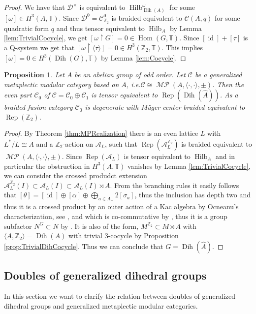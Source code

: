 \documentclass[twoside,11pt,reqno]{amsart}
\makeatletter
\newtheorem{prop}[thm]{Proposition}
\theoremstyle{definition}
\theoremstyle{remark}
\newcommand{\cD}{\mathcal{D}}
\newcommand{\cC}{\mathcal{C}}
\newcommand{\A}{\mathcal{A}}
\newcommand{\TT}{\mathbb{T}}
\newcommand{\ZZ}{\mathbb{Z}}
\DeclareMathOperator{\Rep}{Rep}
\DeclareMathOperator{\Hom}{Hom}
\DeclareMathOperator{\id}{id}
\DeclareRobustCommand{\ie}{i.e.\@\xspace}
\DeclareMathOperator{\Dih}{Dih}
\DeclareMathOperator*{\MP}{\mathcal{MP}}
\DeclareMathOperator{\Vect}{Hilb}
\newcommand{\bi}[2]{\langle #1,#2\rangle}
\newcommand{\bislotslot}{\bi\cdot\cdot}
\makeatother
\begin{document}
\begin{proof}
  We have that $\cD^\times$ is equivalent to $\Vect^{\omega}_{\Dih(A)}$ 
  for some $[\omega]\in H^3(A,\TT)$.
  Since $\cD^0=\cC_{\ZZ_2}^0$ is braided equivalent to $\cC(A,q)$
  for some quadratic form $q$ and thus tensor equivalent to $\Vect_A$ by 
    Lemma \ref{lem:TrivialCocycle}, we get 
  $[\omega\restriction G]=0\in\Hom(G,\TT)$. 
  Since $[\id]+[\tau]$ is a Q-system we get that 
  $[\omega\restriction \langle \tau\rangle] = 0\in H^3(\ZZ_2,\TT)$. 
  This implies $[\omega] = 0\in H^3(\Dih(G),\TT)$ by Lemma \ref{lem:Cocycle}.
\end{proof}
\begin{prop} 
  \label{prop:RepDihedral}
  Let $A$ be an abelian group of odd order. 
  Let $\cC$ be a generalized metaplectic modular category based on $A$, 
  \ie $\cC\cong\MP(A,\bislotslot,\pm)$. 
  Then the even part $\cC_0$ of $\cC=\cC_0\oplus\cC_1$ is tensor equivalent to 
  $\Rep(\Dih(\hat A))$. 
  As a braided fusion category $\cC_0$ is degenerate with M\"uger center 
  braided equivalent to $\Rep(\ZZ_2)$.
\end{prop}
\begin{proof}
  By Theorem \ref{thm:MPRealization} there is an even lattice $L$ with 
  $L^\ast/L\cong A$ and a $\ZZ_2$-action on $\A_L$, such that 
  $\Rep(\A_L^{\ZZ_2})$ is braided equivalent to $\MP(A,\bislotslot,\pm)$. 
  Since $\Rep(\A_L)$ is tensor equivalent to $\Vect_A$ and in particular the 
  obstruction in $H^3(A,\TT)$ vanishes by Lemma  \ref{lem:TrivialCocycle}, we can consider the crossed produdct extension 
  $\A_L^{\ZZ_2}(I)\subset \A_L(I)\subset \A_L(I)\rtimes A$. 
  From the branching rules it easily follows that 
  $[\theta]=[\id]\oplus[\alpha]\oplus \bigoplus_{a\in A_+} 2[\sigma_a]$, 
  thus the inclusion has depth two and thus it is a crossed product by 
  an outer action of a Kac algebra by Ocneanu's characterization, see 
  \cite{Iz1993,Sz1994,Lo1994,Da1996,Sa1997,Iz1998}, 
  and which is co-commutative by 
  \cite[Corollary 9.9]{IzKo2002},
  thus it is a group subfactor $N^G\subset N$ by 
  \cite{VaKa1974,Iz1991,BaSk1993}.
  It is also of the form, $M^{\ZZ_2}\subset M \rtimes A$ with 
  $\langle A ,\ZZ_2\rangle =\Dih(A)$ with trivial 3-cocycle by Proposition 
  \ref{prop:TrivialDihCocycle}.
  Thus we can conclude that $G=\Dih(\hat A)$.
%
%
%
%
%
%
\end{proof}


\subsection{Doubles of generalized dihedral groups}
\label{ssec:DoublesOfGenDihGroups}
In this section we want to clarify the relation between doubles of generalized 
dihedral groups and generalized metaplectic modular categories. 
\end{document}
